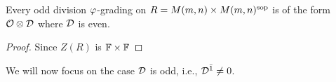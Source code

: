 



\begin{thm}
    Every odd division $\varphi$-grading on $R = M(m,n)\times M(m,n)^{\mathrm{sop}}$ is of the form $\mathcal O \otimes \mathcal{D}$ where $\mathcal{D}$ is even.
\end{thm}

\begin{proof}
    Since $Z(R)$ is $\mathbb{F} \times \mathbb{F}$
\end{proof}



We will now focus on the case $\mathcal{D}$ is odd, i.e., $\mathcal{D}^{\bar1} \neq 0$.

